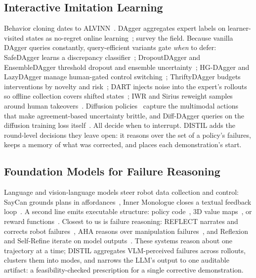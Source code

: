 \documentclass[letterpaper]{article} %
\begin{document}
\subsection{Interactive Imitation Learning}
Behavior cloning dates to ALVINN~\citep{pomerleau1988alvinn}. DAgger
aggregates expert labels on
learner-visited states as no-regret online
learning~\citep{ross2011dagger}; \citet{celemin2022iil} survey the field. Because vanilla DAgger queries
constantly, query-efficient variants gate \emph{when} to defer: SafeDAgger
learns a discrepancy classifier~\citep{zhang2017safedagger}; DropoutDAgger and
EnsembleDAgger threshold dropout and ensemble
uncertainty~\citep{menda2017dropoutdagger,menda2019ensembledagger,gal2016dropout,
lakshminarayanan2017ensembles}; HG-DAgger and LazyDAgger manage human-gated
control switching~\citep{kelly2019hgdagger,hoque2021lazydagger};
ThriftyDAgger budgets interventions by novelty and
risk~\citep{hoque2021thriftydagger}; DART injects noise into the expert's rollouts so offline
collection covers shifted states~\citep{laskey2017dart}; IWR and Sirius reweight samples
around human takeovers~\citep{mandlekar2020iwr,liu2023sirius}. Diffusion
policies~\citep{chi2023diffusionpolicy,ho2020ddpm} capture
the multimodal actions that make agreement-based uncertainty brittle, and
Diff-DAgger queries on the diffusion training loss
itself~\citep{lee2025diffdagger}. All decide when to interrupt. DISTIL adds
the round-level decisions they leave open: it reasons over the set of a
policy's failures, keeps a memory of what was corrected, and places each
demonstration's start.

\subsection{Foundation Models for Failure Reasoning}
Language and vision-language models steer robot data collection and
control: SayCan grounds plans in affordances~\citep{ahn2022saycan}, Inner
Monologue closes a textual feedback loop~\citep{huang2022innermonologue}.
A second line emits executable structure: policy
code~\citep{liang2023codeaspolicies}, 3D value
maps~\citep{huang2023voxposer}, or reward
functions~\citep{ma2024eureka}. Closest to us is
failure reasoning: REFLECT narrates and corrects robot
failures~\citep{liu2023reflect}, AHA reasons over manipulation
failures~\citep{duan2025aha}, and Reflexion and Self-Refine iterate on model
outputs~\citep{shinn2023reflexion,madaan2023selfrefine}. These systems reason
about one trajectory at a time; DISTIL aggregates VLM-perceived failures
across rollouts, clusters them into modes, and narrows the LLM's output to
one auditable artifact: a feasibility-checked prescription for a single
corrective demonstration.
\end{document}
